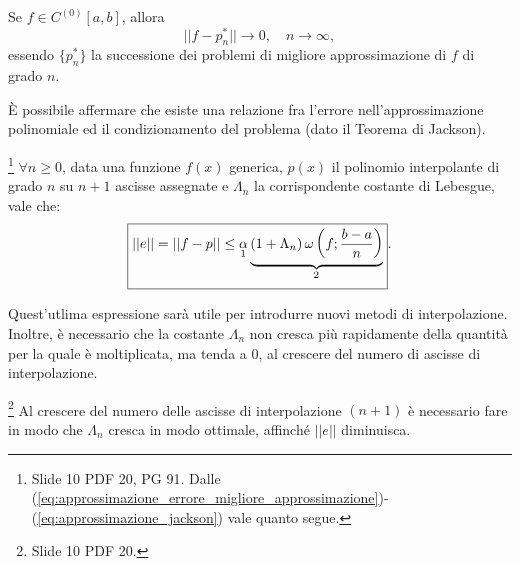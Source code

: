 \addtocounter{footnote}{-1}


\begin{corollary}
    Se $f\in C^{(0)}[a,b]$, allora
    \begin{equation*}
        ||f-p^*_n||\rightarrow 0,\quad n\rightarrow\infty,
    \end{equation*}
    essendo $\{p^*_n\}$ la successione dei problemi di migliore approssimazione di $f$ di grado $n$.
\end{corollary}


È possibile affermare che esiste una relazione fra l'errore nell'approssimazione polinomiale ed il condizionamento del problema (dato il Teorema di Jackson).

\begin{corollary}\footnote{Slide 10 PDF 20, PG 91. Dalle (\ref{eq:approssimazione_errore_migliore_approssimazione})-(\ref{eq:approssimazione_jackson}) vale quanto segue.}
    $\forall n\geq 0$, data una funzione $f(x)$ generica, $p(x)$ il polinomio interpolante di grado $n$ su $n+1$ ascisse assegnate e $\Lambda_n$ la corrispondente costante di Lebesgue, vale che:
    \begin{equation}\label{eq:maggiorazione_errore_migliore_approssimazione}
        \boxed{||e||=||f-p||\leq\underset{\footnotemark}{\alpha}\underbrace{(1+\Lambda_n)\,\omega\left(f;\frac{b-a}{n}\right)}_{\footnotemark}}.
    \end{equation}
\end{corollary}

\addtocounter{footnote}{-1}


Quest'utlima espressione sarà utile per introdurre nuovi metodi di interpolazione. Inoltre, è necessario che la costante $\Lambda_n$ non cresca più rapidamente della quantità per la quale è moltiplicata, ma tenda a 0, al crescere del numero di ascisse di interpolazione.

\begin{remark}\footnote{Slide 10 PDF 20.}
    Al crescere del numero delle ascisse di interpolazione $(n+1)$ è necessario fare in modo che $\Lambda_n$ cresca in modo ottimale, affinché $||e||$ diminuisca.
\end{remark}

